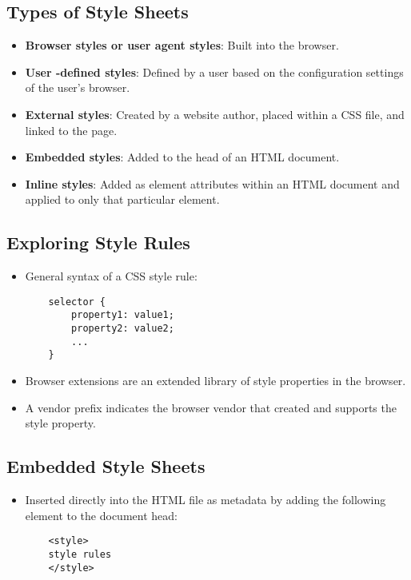 \documentclass{article}
\begin{document}
\subsection{Types of Style Sheets}
\begin{itemize}
    \item \textbf{Browser styles or user agent styles}: Built into the browser.
    \item \textbf{User -defined styles}: Defined by a user based on the configuration settings of the user’s browser.
    \item \textbf{External styles}: Created by a website author, placed within a CSS file, and linked to the page.
    \item \textbf{Embedded styles}: Added to the head of an HTML document.
    \item \textbf{Inline styles}: Added as element attributes within an HTML document and applied to only that particular element.
\end{itemize}

\subsection{Exploring Style Rules}
\begin{itemize}
    \item General syntax of a CSS style rule:
    \begin{lstlisting}
    selector {
        property1: value1;
        property2: value2;
        ...
    }
    \end{lstlisting}
    \item Browser extensions are an extended library of style properties in the browser.
    \item A vendor prefix indicates the browser vendor that created and supports the style property.
\end{itemize}

\subsection{Embedded Style Sheets}
\begin{itemize}
    \item Inserted directly into the HTML file as metadata by adding the following element to the document head:
    \begin{lstlisting}
    <style>
    style rules
    </style>
    \end{lstlisting}
\end{itemize}
\end{document}
